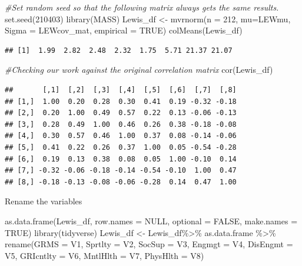 \documentclass[
  english,
]{book}
\newenvironment{Shaded}{\begin{snugshade}}{\end{snugshade}}
\newcommand{\AttributeTok}[1]{\textcolor[rgb]{0.77,0.63,0.00}{#1}}
\newcommand{\CommentTok}[1]{\textcolor[rgb]{0.56,0.35,0.01}{\textit{#1}}}
\newcommand{\ConstantTok}[1]{\textcolor[rgb]{0.00,0.00,0.00}{#1}}
\newcommand{\DecValTok}[1]{\textcolor[rgb]{0.00,0.00,0.81}{#1}}
\newcommand{\FunctionTok}[1]{\textcolor[rgb]{0.00,0.00,0.00}{#1}}
\newcommand{\NormalTok}[1]{#1}
\newcommand{\OtherTok}[1]{\textcolor[rgb]{0.56,0.35,0.01}{#1}}
\newcommand{\SpecialCharTok}[1]{\textcolor[rgb]{0.00,0.00,0.00}{#1}}
\begin{document}
\begin{Shaded}
\begin{Highlighting}[]
\CommentTok{\#Set random seed so that the following matrix always gets the same results.}
\FunctionTok{set.seed}\NormalTok{(}\DecValTok{210403}\NormalTok{)}
\FunctionTok{library}\NormalTok{(MASS)}
\NormalTok{Lewis\_df }\OtherTok{\textless{}{-}} \FunctionTok{mvrnorm}\NormalTok{(}\AttributeTok{n =} \DecValTok{212}\NormalTok{, }\AttributeTok{mu=}\NormalTok{LEWmu, }\AttributeTok{Sigma =}\NormalTok{ LEWcov\_mat, }\AttributeTok{empirical =} \ConstantTok{TRUE}\NormalTok{)}
\FunctionTok{colMeans}\NormalTok{(Lewis\_df)}
\end{Highlighting}
\end{Shaded}

\begin{verbatim}
## [1]  1.99  2.82  2.48  2.32  1.75  5.71 21.37 21.07
\end{verbatim}

\begin{Shaded}
\begin{Highlighting}[]
\CommentTok{\#Checking our work against the original correlation matrix}
\FunctionTok{cor}\NormalTok{(Lewis\_df)}
\end{Highlighting}
\end{Shaded}

\begin{verbatim}
##       [,1]  [,2]  [,3]  [,4]  [,5]  [,6]  [,7]  [,8]
## [1,]  1.00  0.20  0.28  0.30  0.41  0.19 -0.32 -0.18
## [2,]  0.20  1.00  0.49  0.57  0.22  0.13 -0.06 -0.13
## [3,]  0.28  0.49  1.00  0.46  0.26  0.38 -0.18 -0.08
## [4,]  0.30  0.57  0.46  1.00  0.37  0.08 -0.14 -0.06
## [5,]  0.41  0.22  0.26  0.37  1.00  0.05 -0.54 -0.28
## [6,]  0.19  0.13  0.38  0.08  0.05  1.00 -0.10  0.14
## [7,] -0.32 -0.06 -0.18 -0.14 -0.54 -0.10  1.00  0.47
## [8,] -0.18 -0.13 -0.08 -0.06 -0.28  0.14  0.47  1.00
\end{verbatim}

Rename the variables

\begin{Shaded}
\begin{Highlighting}[]
\FunctionTok{as.data.frame}\NormalTok{(Lewis\_df, }\AttributeTok{row.names =} \ConstantTok{NULL}\NormalTok{, }\AttributeTok{optional =} \ConstantTok{FALSE}\NormalTok{, }\AttributeTok{make.names =} \ConstantTok{TRUE}\NormalTok{)}
\FunctionTok{library}\NormalTok{(tidyverse)}
\NormalTok{Lewis\_df }\OtherTok{\textless{}{-}}\NormalTok{ Lewis\_df}\SpecialCharTok{\%\textgreater{}\%}
\NormalTok{  as.data.frame }\SpecialCharTok{\%\textgreater{}\%}
  \FunctionTok{rename}\NormalTok{(}\AttributeTok{GRMS =}\NormalTok{ V1, }\AttributeTok{Sprtlty =}\NormalTok{ V2, }\AttributeTok{SocSup =}\NormalTok{ V3, }\AttributeTok{Engmgt =}\NormalTok{ V4, }\AttributeTok{DisEngmt =}\NormalTok{ V5, }\AttributeTok{GRIcntlty =}\NormalTok{ V6, }\AttributeTok{MntlHlth =}\NormalTok{ V7, }\AttributeTok{PhysHlth =}\NormalTok{ V8)}
\end{Highlighting}
\end{Shaded}
\end{document}
